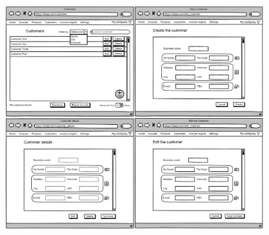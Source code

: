 \begin{figure}[h!]
    \centering
    \includegraphics[height=420pt, keepaspectratio]{resources/mockup/Customer.png}
\end{figure}
\newpage

